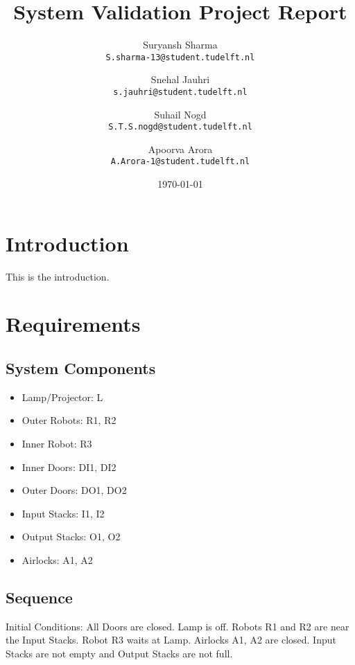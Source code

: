\documentclass[a4paper,12pt]{article}
\begin{document}
\title{System Validation Project Report}
\author{
	Suryansh Sharma \\ 
	\texttt{S.sharma-13@student.tudelft.nl}
 	\and 
	Snehal Jauhri \\
	\texttt{s.jauhri@student.tudelft.nl} 
	\and
	Suhail Nogd \\
	\texttt{S.T.S.nogd@student.tudelft.nl} 	
	 \and 
	Apoorva Arora\\
	\texttt{A.Arora-1@student.tudelft.nl} 
}

\date {\today}
\maketitle

\section{Introduction}
This is the introduction.

\section{Requirements}

\subsection{System Components}
\begin{itemize}
\item Lamp/Projector: L
\item Outer Robots: R1, R2
\item Inner Robot: R3
\item Inner Doors: DI1, DI2
\item Outer Doors: DO1, DO2
\item Input Stacks: I1, I2
\item Output Stacks: O1, O2
\item Airlocks: A1, A2
\end{itemize}

\subsection{Sequence}
Initial Conditions: All Doors are closed. Lamp is off. Robots R1 and R2 are near the Input Stacks. Robot R3 waits at Lamp. Airlocks A1, A2 are closed. Input Stacks are not empty and Output Stacks are not full.
\end{document}
